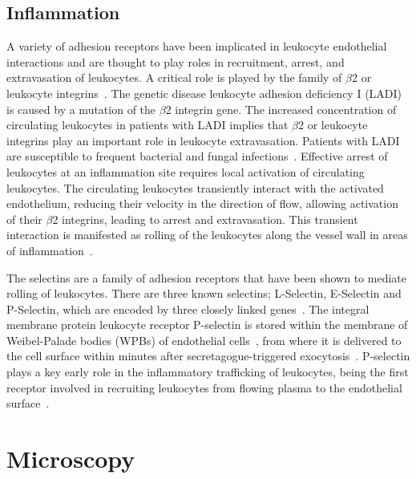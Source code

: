 \subsection{Inflammation}

A variety of adhesion receptors have been implicated in leukocyte endothelial interactions and are thought to play roles in recruitment, arrest, and extravasation of leukocytes. A critical role is played by the family of $\beta$2 or leukocyte integrins~\cite{Springer1990, Mayadas1993}. The genetic disease leukocyte adhesion deficiency I (LADI) is caused by a mutation of the $\beta$2 integrin gene. The increased concentration of circulating leukocytes in patients with LADI implies that $\beta$2 or leukocyte integrins play an important role in leukocyte extravasation. Patients with LADI are susceptible to frequent bacterial and fungal infections~\cite{Anderson1987}. Effective arrest of leukocytes at an inflammation site requires local activation of circulating leukocytes. The circulating leukocytes transiently interact with the activated endothelium, reducing their velocity in the direction of flow, allowing activation of their $\beta$2 integrins, leading to arrest and extravasation. This transient interaction is manifested as rolling of the leukocytes along the vessel wall in areas of inflammation~\cite{Mayadas1993, Atherton1972}.

The selectins are a family of adhesion receptors that have been shown to mediate rolling of leukocytes. There are three known selectins; L-Selectin, E-Selectin and P-Selectin, which are encoded by three closely linked genes~\cite{Watson1990}. The integral membrane protein leukocyte receptor P-selectin is stored within the membrane of Weibel-Palade bodies (WPBs) of endothelial cells~\cite{Bonfanti1989, McEver1989}, from where it is delivered to the cell surface within minutes after secretagogue-triggered exocytosis~\cite{McEver2002}. P-selectin plays a key early role in the inflammatory trafficking of leukocytes, being the first receptor involved in recruiting leukocytes from flowing plasma to the endothelial surface~\cite{Larsen1989}.


\section{Microscopy}


